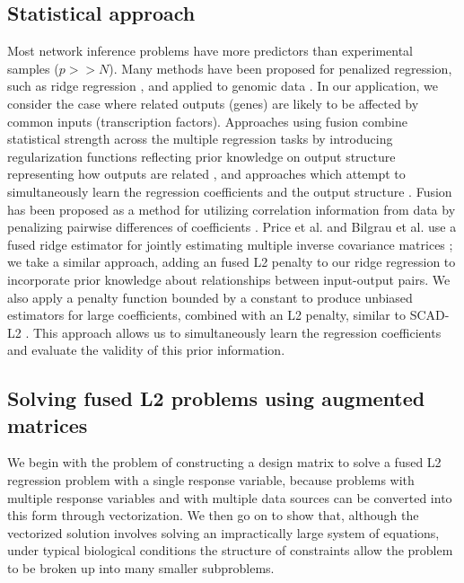 \documentclass[11pt]{article}
\begin{document}
\subsection{Statistical approach}
Most network inference problems have more predictors than experimental samples ($p >> N$). Many methods have been proposed for penalized regression, such as ridge regression \cite{hoerl_ridge_1970}, and applied to genomic data \cite{waldron_optimized_2011, li_network-constrained_2008}. In our application, we consider the case where related outputs (genes) are likely to be affected by common inputs (transcription factors). Approaches using fusion combine statistical strength across the multiple regression tasks by introducing regularization functions reflecting prior knowledge on output structure representing how outputs are related \cite{kim_tree-guided_2012,Land1997,Chen2010,Petry2011,Hebiri2011}, and approaches which attempt to simultaneously learn the regression coefficients and the output structure \cite{sohn_joint_2012}. Fusion has been proposed as a method for utilizing correlation information from data by penalizing pairwise differences of coefficients \cite{Daye2009,Price2014}. Price et al. and Bilgrau et al. use a fused ridge estimator for jointly estimating multiple inverse covariance matrices \cite{Price2014a,Bilgrau2015}; we take a similar approach, adding an fused L2 penalty to our ridge regression to incorporate prior knowledge about relationships between input-output pairs. We also apply a penalty function bounded by a constant to produce unbiased estimators for large coefficients, combined with an L2 penalty, similar to SCAD-L2 \cite{Zeng2012}. This approach allows us to simultaneously learn the regression coefficients and evaluate the validity of this prior information. 

\subsection{Solving fused L2 problems using augmented matrices}
We begin with the problem of constructing a design matrix to solve a fused L2 regression problem with a single response variable, because problems with multiple response variables and with multiple data sources can be converted into this form through vectorization. We then go on to show that, although the vectorized solution involves solving an impractically large system of equations, under typical biological conditions the structure of constraints allow the problem to be broken up into many smaller subproblems. 
\end{document}
